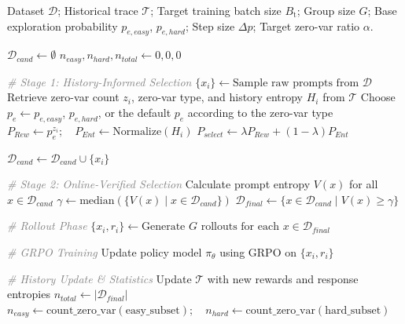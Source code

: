 \begin{algorithm}[t]
\caption{Training Iteration in HIVE}
\label{alg:hive-training}
\begin{algorithmic}[1]
    \REQUIRE Dataset $\mathcal{D}$; Historical trace $\mathcal{T}$; Target training batch size $B_{\text{t}}$; Group size $G$; Base exploration probability $p_{e,easy}$, $p_{e,hard}$; Step size $\Delta p$; Target zero-var ratio $\alpha$.
    
    \STATE $\mathcal{D}_{cand} \gets \emptyset$
    \STATE $n_{easy}, n_{hard}, n_{total} \gets 0, 0, 0$
    
    \STATE \textcolor{gray}{\textit{\# Stage 1: History-Informed Selection}}
    \REPEAT
        \STATE $\{x_i\} \gets \text{Sample raw prompts from } \mathcal{D}$
            \STATE Retrieve zero-var count $z_i$, zero-var type, and history entropy $H_i$ from $\mathcal{T}$
            \STATE Choose $p_e \gets p_{e,easy}$, $p_{e,hard}$, or the default $p_e$ according to the zero-var type
            \STATE $P_{Rew} \gets p_e^{z_i}; \quad P_{Ent} \gets \text{Normalize}(H_i)$
            \STATE $P_{select} \gets \lambda P_{Rew} + (1-\lambda) P_{Ent}$
            
                \STATE $\mathcal{D}_{cand} \gets \mathcal{D}_{cand} \cup \{x_i\}$
            \ENDIF
        \ENDFOR

    \STATE \textcolor{gray}{\textit{\# Stage 2: Online-Verified Selection}} %
    \STATE Calculate prompt entropy $V(x)$ for all $x \in \mathcal{D}_{cand}$
    \STATE $\gamma \gets \text{median}(\{V(x) \mid x \in \mathcal{D}_{cand}\})$
    \STATE $\mathcal{D}_{final} \gets \{x \in \mathcal{D}_{cand} \mid V(x) \geq \gamma\}$

    \STATE \textcolor{gray}{\textit{\# Rollout Phase}}
    \STATE $\{x_i, r_i\} \gets \text{Generate } G \text{ rollouts for each } x \in \mathcal{D}_{final}$

    \STATE \textcolor{gray}{\textit{\# GRPO Training}}
    \STATE Update policy model $\pi_\theta$ using GRPO on $\{x_i, r_i\}$
    
    \STATE \textcolor{gray}{\textit{\# History Update \& Statistics}}
    \STATE Update $\mathcal{T}$ with new rewards and response entropies
    \STATE $n_{total} \gets |\mathcal{D}_{final}|$
    \STATE $n_{easy} \gets \text{count\_zero\_var}(\text{easy\_subset}); \quad n_{hard} \gets \text{count\_zero\_var}(\text{hard\_subset})$


\end{algorithmic}
\end{algorithm}
